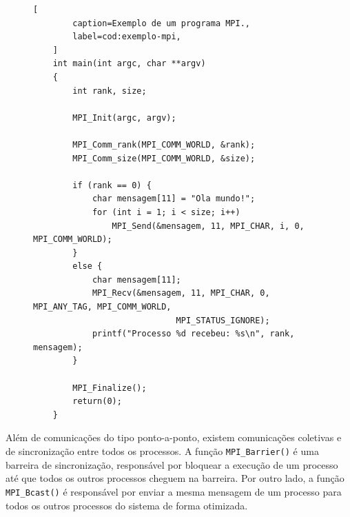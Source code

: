 \begin{figure}[t]
	\begin{lstlisting}[
		caption=Exemplo de um programa MPI.,
		label=cod:exemplo-mpi,
	]
	int main(int argc, char **argv)
	{
		int rank, size;

		MPI_Init(argc, argv);

		MPI_Comm_rank(MPI_COMM_WORLD, &rank);
		MPI_Comm_size(MPI_COMM_WORLD, &size);

		if (rank == 0) {
			char mensagem[11] = "Ola mundo!";
			for (int i = 1; i < size; i++)
				MPI_Send(&mensagem, 11, MPI_CHAR, i, 0, MPI_COMM_WORLD);
		}
		else {
			char mensagem[11];
			MPI_Recv(&mensagem, 11, MPI_CHAR, 0, MPI_ANY_TAG, MPI_COMM_WORLD,
							 MPI_STATUS_IGNORE);
			printf("Processo %d recebeu: %s\n", rank, mensagem);
		}

		MPI_Finalize();
		return(0);
	}
	\end{lstlisting}
\end{figure}

Além de comunicações do tipo ponto-a-ponto, existem comunicações coletivas e de sincronização entre
todos os processos. A função \texttt{MPI\_Barrier()} é uma barreira de sincronização, responsável por bloquear a
execução de um processo até que todos os outros processos cheguem na barreira.
Por outro lado, a função \texttt{MPI\_Bcast()} é responsável por enviar a mesma
mensagem de um processo para todos os outros processos do sistema de forma otimizada.

%
%
%
%
%
%


